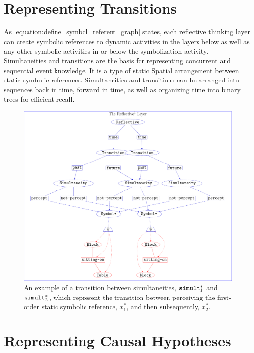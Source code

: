 \section{Representing Transitions}

As {\mbox{\autoref{equation:define_symbol_referent_graph}}} states,
each reflective thinking layer can create symbolic references to
dynamic activities in the layers below as well as any other symbolic
activities in or below the symbolization activity.  Simultaneities and
transitions are the basis for representing concurrent and sequential
event knowledge.  It is a type of static Spatial arrangement between
static symbolic references.  Simultaneities and transitions can be
arranged into sequences back in time, forward in time, as well as
organizing time into binary trees for efficient recall.
\begin{figure}
\center
\includegraphics[width=12cm]{gfx/example_transition}
\caption[An example of a transition between simultaneities.]{An
  example of a transition between simultaneities,
  $\text{\tt{simult}}_1^*$ and $\text{\tt{simult}}_2^*$, which
  represent the transition between perceiving the first-order static
  symbolic reference, $x_1^*$, and then subsequently, $x_2^*$.}
\label{figure:example_transition}
\end{figure}

\section{Representing Causal Hypotheses}

